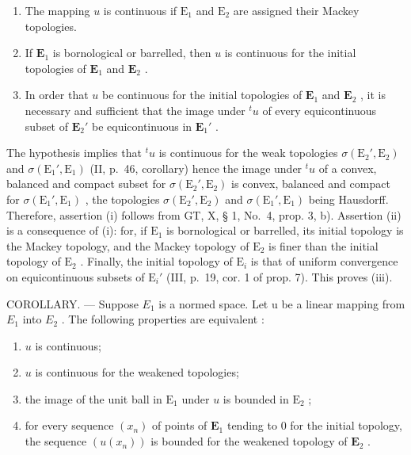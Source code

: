 \begin{enumerate}
\def\labelenumi{(\roman{enumi})}
\item
  The mapping \(u\) is continuous if \(\mathrm{E}_1\) and \(\mathrm{E}_2\) are assigned their Mackey topologies.
\item
  If \(\mathbf{E}_1\) is bornological or barrelled, then \(u\) is continuous for the initial topologies of \(\mathbf{E}_1\) and \(\mathbf{E}_2\) .
\item
  In order that \(u\) be continuous for the initial topologies of \(\mathbf{E}_1\) and \(\mathbf{E}_2\) , it is necessary and sufficient that the image under \(^t u\) of every equicontinuous subset of \(\mathbf{E}_2'\) be equicontinuous in \(\mathbf{E}_1'\) .
\end{enumerate}

The hypothesis implies that \({}^t u\) is continuous for the weak topologies \(\sigma(\mathrm{E}_2', \mathrm{E}_2)\) and \(\sigma(\mathrm{E}_1', \mathrm{E}_1)\) (II, p.~46, corollary) hence the image under \({}^t u\) of a convex, balanced and compact subset for \(\sigma(\mathrm{E}_2', \mathrm{E}_2)\) is convex, balanced and compact for \(\sigma(\mathrm{E}_1', \mathrm{E}_1)\) , the topologies \(\sigma(\mathrm{E}_2', \mathrm{E}_2)\) and \(\sigma(\mathrm{E}_1', \mathrm{E}_1)\) being Hausdorff. Therefore, assertion (i) follows from GT, X, § 1, No.~4, prop. 3, b). Assertion (ii) is a consequence of (i): for, if \(\mathrm{E}_1\) is bornological or barrelled, its initial topology is the Mackey topology, and the Mackey topology of \(\mathrm{E}_2\) is finer than the initial topology of \(\mathrm{E}_2\) . Finally, the initial topology of \(\mathrm{E}_i\) is that of uniform convergence on equicontinuous subsets of \(\mathrm{E}_i'\) (III, p.~19, cor. 1 of prop. 7). This proves (iii).

COROLLARY. --- Suppose \(E_{1}\) is a normed space. Let u be a linear mapping from \(E_{1}\) into \(E_{2}\) . The following properties are equivalent :

\begin{enumerate}
\def\labelenumi{\alph{enumi})}
\item
  \(u\) is continuous;
\item
  \(u\) is continuous for the weakened topologies;
\item
  the image of the unit ball in \(\mathrm{E}_1\) under \(u\) is bounded in \(\mathrm{E}_2\) ;
\item
  for every sequence \((x_{n})\) of points of \(\mathbf{E}_1\) tending to 0 for the initial topology, the sequence \((u(x_{n}))\) is bounded for the weakened topology of \(\mathbf{E}_2\) .
\end{enumerate}

